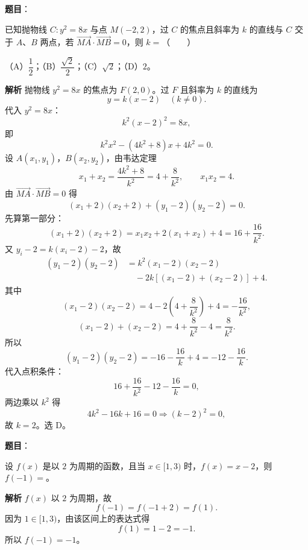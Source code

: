 \begin{answer}

\textbf{题目}：

已知抛物线 $C:y^2=8x$ 与点 $M(-2,2)$，过 $C$ 的焦点且斜率为 $k$ 的直线与 $C$ 交于 $A$、$B$ 两点，若 $\overrightarrow{MA}\cdot\overrightarrow{MB}=0$，则 $k=$\mbox{（　　）}

（A）$\dfrac12$；（B）$\dfrac{\sqrt2}2$；（C）$\sqrt2$；（D）$2$。

\textbf{解析}
抛物线 $y^2=8x$ 的焦点为 $F(2,0)$。过 $F$ 且斜率为 $k$ 的直线为
\nopagebreak[4]
\[y=k(x-2)\quad(k\neq0).\]
代入 $y^2=8x$：
\nopagebreak[4]
\[k^2(x-2)^2=8x,\]
即
\nopagebreak[4]
\[k^2x^2-(4k^2+8)x+4k^2=0.\]
设 $A(x_1,y_1)$，$B(x_2,y_2)$，由韦达定理
\nopagebreak[4]
\[x_1+x_2=\frac{4k^2+8}{k^2}=4+\frac8{k^2},\qquad
x_1x_2=4.\]
由 $\overrightarrow{MA}\cdot\overrightarrow{MB}=0$ 得
\nopagebreak[4]
\[(x_1+2)(x_2+2)+(y_1-2)(y_2-2)=0.\]
先算第一部分：
\nopagebreak[4]
\[(x_1+2)(x_2+2)=x_1x_2+2(x_1+x_2)+4
=16+\frac{16}{k^2}.\]
又 $y_i-2=k(x_i-2)-2$，故
\nopagebreak[4]
\[\begin{aligned}
(y_1-2)(y_2-2)
&=k^2(x_1-2)(x_2-2)\\
&\quad-2k\left[(x_1-2)+(x_2-2)\right]+4.
\end{aligned}\]
其中
\nopagebreak[4]
\[(x_1-2)(x_2-2)=4-2\left(4+\frac8{k^2}\right)+4
=-\frac{16}{k^2},\]
\nopagebreak[4]
\[(x_1-2)+(x_2-2)=4+\frac8{k^2}-4=\frac8{k^2}.\]
所以
\nopagebreak[4]
\[(y_1-2)(y_2-2)
=-16-\frac{16}{k}+4=-12-\frac{16}{k}.\]
代入点积条件：
\nopagebreak[4]
\[16+\frac{16}{k^2}-12-\frac{16}{k}=0,\]
两边乘以 $k^2$ 得
\nopagebreak[4]
\[4k^2-16k+16=0\Longrightarrow (k-2)^2=0,\]
故 $k=2$。选 D。


\end{answer}
\begin{answer}

\textbf{题目}：

设 $f(x)$ 是以 $2$ 为周期的函数，且当 $x\in[1,3)$ 时，$f(x)=x-2$，则 $f(-1)=$\gkblank{}。

\textbf{解析}
$f(x)$ 以 $2$ 为周期，故
\nopagebreak[4]
\[f(-1)=f(-1+2)=f(1).\]
因为 $1\in[1,3)$，由该区间上的表达式得
\nopagebreak[4]
\[f(1)=1-2=-1.\]
所以 $f(-1)=-1$。


\end{answer}
